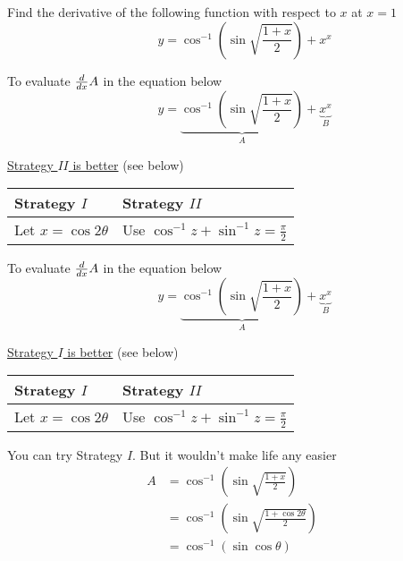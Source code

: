 \documentclass[14pt,fleqn]{extarticle}
\newcommand\fxa{\sqrt{\frac{1+x}{2}}}
\begin{document}
\begin{question}
	\statement 
    
     Find the derivative of the following function with respect to $x$ 
     at $ x = 1$ 
     \[ \qquad y = \cos^{-1} \left(\sin\fxa \right) + x^x \] 
     
     \begin{step}
  \begin{options} 
      
     \correct 
     
      To evaluate $\frac{d}{dx} A$ in the equation below       
	\[ \qquad y = \underbrace{\cos^{-1} \left(\sin\fxa \right)}_A + \underbrace{x^x}_B \]
	
	\underline{Strategy $II$ is better} (see below) 
	
	\begin{center}
  \begin{tabular}{ll}
   \toprule
        Strategy $I$ & Strategy $II$  \\
   \midrule 
   Let $x = \cos 2\theta$ & Use $\cos^{-1} z + \sin^{-1} z = \frac\pi{2}$ \\
    \bottomrule
  \end{tabular}
\end{center}

     \incorrect

     To evaluate $\frac{d}{dx} A$ in the equation below       
	\[ \qquad y = \underbrace{\cos^{-1} \left(\sin\fxa \right)}_A + \underbrace{x^x}_B \]
	
	\underline{Strategy $I$ is better} (see below) 
	
	\begin{center}
  \begin{tabular}{ll}
   \toprule
        Strategy $I$ & Strategy $II$  \\
   \midrule 
   Let $x = \cos 2\theta$ & Use $\cos^{-1} z + \sin^{-1} z = \frac\pi{2}$ \\
    \bottomrule
  \end{tabular}
\end{center}
	
	

      
    \end{options} 
     \reason 
       
     You can try Strategy $I$. But it wouldn't make life any easier 
     \begin{align}
	   A &= \cos^{-1} \left(\sin \fxa \right) \\
	   &= \cos^{-1} \left(\sin \sqrt{\frac{1+\cos 2\theta}{2}} \right) \\
	   &= \cos^{-1} \left(\sin \cos\theta \right)
\end{align}


\end{step}
\end{question}
\end{document}
